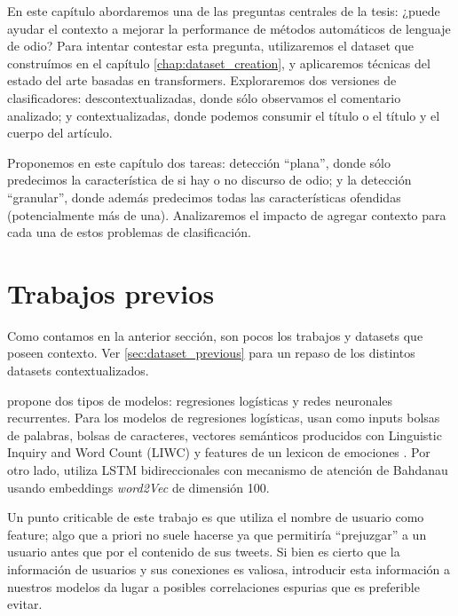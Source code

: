 
En este capítulo abordaremos una de las preguntas centrales de la tesis: ¿puede ayudar el contexto a mejorar la performance de métodos automáticos de lenguaje de odio? Para intentar contestar esta pregunta, utilizaremos el dataset que construímos en el capítulo \ref{chap:dataset_creation}, y aplicaremos técnicas del estado del arte basadas en transformers. Exploraremos dos versiones de clasificadores: descontextualizadas, donde sólo observamos el comentario analizado; y contextualizadas, donde podemos consumir el título o el título y el cuerpo del artículo.

Proponemos en este capítulo dos tareas: detección ``plana'', donde sólo predecimos la característica de si hay o no discurso de odio; y la detección ``granular'', donde además predecimos todas las características ofendidas (potencialmente más de una). Analizaremos el impacto de agregar contexto para cada una de estos problemas de clasificación.


\section{Trabajos previos}
\label{sec:06_classification_previous}

Como contamos en la anterior sección, son pocos los trabajos y datasets que poseen contexto. Ver \ref{sec:dataset_previous} para un repaso de los distintos datasets contextualizados.

\citet{gao-huang-2017-detecting} propone dos tipos de modelos: regresiones logísticas y redes neuronales recurrentes. Para los modelos de regresiones logísticas, usan como inputs bolsas de palabras, bolsas de caracteres, vectores semánticos producidos con Linguistic Inquiry and Word Count (LIWC) \cite{pennebaker2001linguistic} y features de un lexicon de emociones \cite{mohammad2013nrc}. Por otro lado, utiliza LSTM bidireccionales con mecanismo de atención de Bahdanau \cite{bahdanau2014neural} usando embeddings \emph{word2Vec} de dimensión 100.

Un punto criticable de este trabajo es que utiliza el nombre de usuario como feature; algo que a priori no suele hacerse ya que permitiría ``prejuzgar'' a un usuario antes que por el contenido de sus tweets. Si bien es cierto que la información de usuarios y sus conexiones es valiosa, introducir esta información a nuestros modelos da lugar a posibles correlaciones espurias que es preferible evitar.


